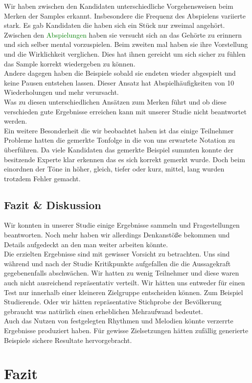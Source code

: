 \documentclass{acm_proc_article-sp}
\begin{document}
Wir haben zwischen den Kandidaten unterschiedliche Vorgehensweisen beim Merken der Samples erkannt. Insbesondere die Frequenz des Abspielens variierte stark. Es gab Kandidaten die haben sich ein Stück nur zweimal angehört. Zwischen den \textcolor{green}{Abspielungen} haben sie versucht sich an das Gehörte zu erinnern und sich selber mental vorzuspielen. Beim zweiten mal haben sie ihre Vorstellung und die Wirklichkeit verglichen. Dies hat ihnen gereicht um sich sicher zu fühlen das Sample korrekt wiedergeben zu können.\\
Andere dagegen haben die Beispiele sobald sie endeten wieder abgespielt und keine Pausen entstehen lassen. Dieser Ansatz hat Abspielhäufigkeiten von 10 Wiederholungen und mehr verursacht.\\ 
Was zu diesen unterschiedlichen Ansätzen zum Merken führt und ob diese verschieden gute Ergebnisse erreichen kann mit unserer Studie nicht beantwortet werden.\\

Ein weitere Besonderheit die wir beobachtet haben ist das einige Teilnehmer Probleme hatten die gemerkte Tonfolge in die von uns erwartete Notation zu überführen. Da viele Kandidaten das gemerkte Beispiel summten konnte der besitzende Experte klar erkennen das es sich korrekt gemerkt wurde. Doch beim einordnen der Töne in höher, gleich, tiefer oder kurz, mittel, lang wurden trotzdem Fehler gemacht.
\subsection{Fazit \& Diskussion}
Wir konnten in unserer Studie einige Ergebnisse sammeln und Fragestellungen beantworten. Noch mehr haben wir allerdings Denkanstöße bekommen und Details aufgedeckt an den man weiter arbeiten könnte. \\
Die erzielten Ergebnisse sind mit gewisser Vorsicht zu betrachten. Uns sind während und nach der Studie Kritikpunkte aufgefallen die die Aussagekraft gegebenenfalls abschwächen. Wir hatten zu wenig Teilnehmer und diese waren auch nicht ausreichend repräsentativ verteilt. Wir hätten uns entweder für einen Test nur innerhalb einer kleineren Zielgruppe entscheiden können. Zum Beispiel Studierende. Oder wir hätten repräsentative Stichprobe der Bevölkerung gebraucht was natürlich einen erheblichen Mehraufwand bedeutet.\\
Auch das Nutzen von festgelegten Rhythmen und Melodien könnte verzerrte Ergebnisse produziert haben. Für gewisse Zielsetzungen hätten zufällig generierte Beispiele sichere Resultate hervorgebracht.


\section{Fazit}
\printbibliography
\end{document}
